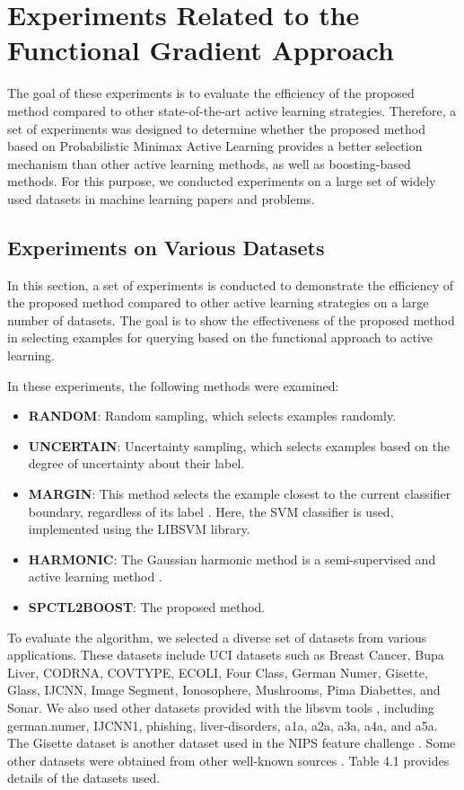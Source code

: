 \documentclass[12pt]{article}
\begin{document}
	\section{Experiments Related to the Functional Gradient Approach}
	The goal of these experiments is to evaluate the efficiency of the proposed method compared to other state-of-the-art active learning strategies. Therefore, a set of experiments was designed to determine whether the proposed method based on Probabilistic Minimax Active Learning provides a better selection mechanism than other active learning methods, as well as boosting-based methods. For this purpose, we conducted experiments on a large set of widely used datasets in machine learning papers and problems.
	
	\subsection{Experiments on Various Datasets}
	In this section, a set of experiments is conducted to demonstrate the efficiency of the proposed method compared to other active learning strategies on a large number of datasets. The goal is to show the effectiveness of the proposed method in selecting examples for querying based on the functional approach to active learning.
	
	In these experiments, the following methods were examined:
	\begin{itemize}
		\item \textbf{RANDOM}: Random sampling, which selects examples randomly.
		\item \textbf{UNCERTAIN}: Uncertainty sampling, which selects examples based on the degree of uncertainty about their label.
		\item \textbf{MARGIN}: This method selects the example closest to the current classifier boundary, regardless of its label \cite{scheffer2001active}. Here, the SVM classifier is used, implemented using the LIBSVM library.
		\item \textbf{HARMONIC}: The Gaussian harmonic method is a semi-supervised and active learning method \cite{zhu2003semi}.
		\item \textbf{SPCTL2BOOST}: The proposed method.
	\end{itemize}
	
	To evaluate the algorithm, we selected a diverse set of datasets from various applications. These datasets include UCI datasets such as Breast Cancer, Bupa Liver, CODRNA, COVTYPE, ECOLI, Four Class, German Numer, Gisette, Glass, IJCNN, Image Segment, Ionosophere, Mushrooms, Pima Diabettes, and Sonar. We also used other datasets provided with the libsvm tools \cite{chang2011libsvm}, including german.numer, IJCNN1, phishing, liver-disorders, a1a, a2a, a3a, a4a, and a5a. The Gisette dataset is another dataset used in the NIPS feature challenge \cite{guyon2004result}. Some other datasets were obtained from other well-known sources \cite{newman1998uci, asuncion2007uci}. Table 4.1 provides details of the datasets used.
	
\end{document}
